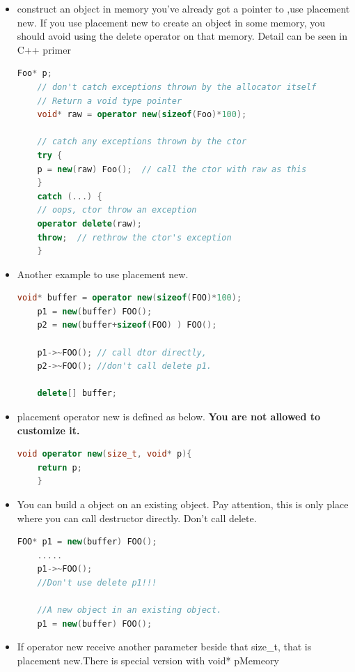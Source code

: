 \documentclass[a4paper,12pt,twoside]{book}
\begin{document}
\begin{itemize}
	\item construct an object in memory you've already got a pointer to ,use placement new. If you use placement new to create an object in some memory, you should avoid using the delete operator on that memory.  Detail can be seen in C++ primer
	\begin{lstlisting}[frame=single, language=c++]
	Foo* p;
	// don't catch exceptions thrown by the allocator itself
	// Return a void type pointer
	void* raw = operator new(sizeof(Foo)*100);
	
	// catch any exceptions thrown by the ctor
	try {
	p = new(raw) Foo();  // call the ctor with raw as this
	}
	catch (...) {
	// oops, ctor throw an exception
	operator delete(raw);
	throw;  // rethrow the ctor's exception
	}
	\end{lstlisting}
	
	\item Another example to use placement new.
	\begin{lstlisting}[frame=single, language=c++]
	void* buffer = operator new(sizeof(FOO)*100);
	p1 = new(buffer) FOO();
	p2 = new(buffer+sizeof(FOO) ) FOO();
	
	p1->~FOO(); // call dtor directly,
	p2->~FOO(); //don't call delete p1.
	
	delete[] buffer;
	\end{lstlisting}
	
	\item placement operator new is defined as below. \textbf{You are not allowed to customize it.}
	\begin{lstlisting}[frame=single, language=c++]
	void operator new(size_t, void* p){
	return p;
	}
	\end{lstlisting}
	
	\item You can build a object on an existing object. Pay attention, this is only place where you can call destructor directly. Don't call delete. 
	\begin{lstlisting}[frame=single, language=c++]
	FOO* p1 = new(buffer) FOO();
	.....
	p1->~FOO();
	//Don't use delete p1!!!
	
	//A new object in an existing object.
	p1 = new(buffer) FOO(); 
	\end{lstlisting}
	
	\item If operator new receive another parameter beside that size\_t, that is placement new.There is special version with void* pMemeory
	

\end{itemize}
\end{document}

